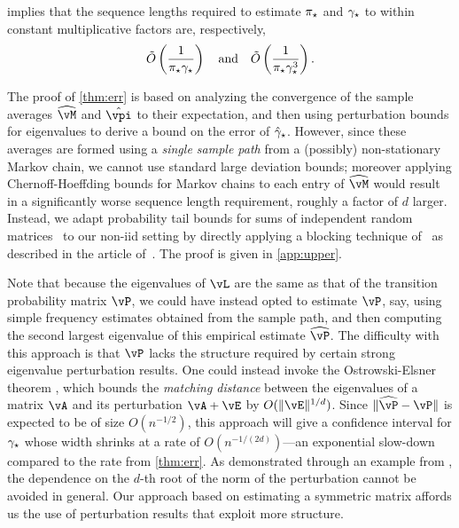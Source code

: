  implies that the sequence lengths required to estimate
$\pi_{\star}$ and
$\gamma_{\star}$ to within constant multiplicative factors are, respectively,
\[
  \tilde{O}\left(\frac1{\pi_{\star}\gamma_{\star}}\right)
  \quad\text{and}\quad
  \tilde{O}\left(\frac1{\pi_{\star}\gamma_{\star}^3}\right)
  .
\]

The proof of \cref{thm:err} is based on analyzing the
convergence of the sample averages $\wh{\vM}$ and
$\hat\vpi$ to their expectation, and then using perturbation bounds
for eigenvalues to derive a bound on the error of $\hat\gamma_{\star}$.
However, since these averages are formed using a \emph{single sample
path} from a (possibly) non-stationary Markov chain, we cannot use
standard large deviation bounds; moreover applying Chernoff-Hoeffding
bounds for Markov chains to each entry of $\wh{\vM}$ would result in a
significantly worse sequence length requirement, roughly a factor of
$d$ larger.
Instead, we adapt probability tail bounds for sums of independent
random matrices~\citep{tropp2015intro} to our non-iid setting by
directly applying a blocking technique of~\citet{Bernstein27} as
described in the article of~\citet{Yu94}.
The proof is given in \cref{app:upper}.

Note that because the eigenvalues of $\vL$ are the same as that of the
transition probability matrix $\vP$, 
we could have instead opted to
estimate $\vP$, say, using simple frequency estimates obtained from
the sample path, and then computing the second largest eigenvalue of
this empirical estimate $\wh\vP$.
The difficulty with this approach is that $\vP$ lacks the structure
required by certain strong eigenvalue perturbation results.
One could instead invoke the Ostrowski-Elsner theorem
\citep[cf.~Theorem 1.4 on Page 170 of][]{stewart1990matrix}, which
bounds the \emph{matching distance} between the eigenvalues of a
matrix $\vA$ and its perturbation $\vA+\vE$ by $O(\norm{\vE}^{1/d})$.
Since $\norm{\wh\vP-\vP}$ is expected to be of size $O(n^{-1/2})$,
this approach will give a confidence interval for $\gamma_{\star}$ whose width
shrinks at a rate of $O(n^{-1/(2d)})$---an exponential slow-down
compared to the rate from \cref{thm:err}.
As demonstrated through an example from \citet{stewart1990matrix}, the
dependence on the $d$-th root of the norm of the perturbation cannot
be avoided in general.
Our approach based on estimating a symmetric matrix affords us the use
of perturbation results that exploit more structure.

